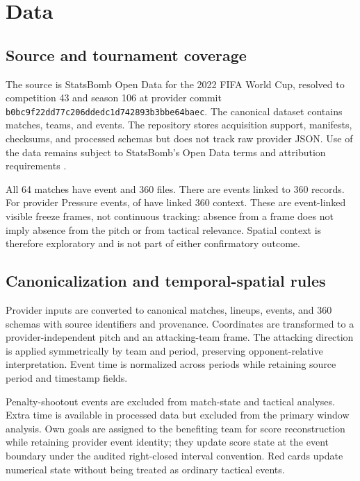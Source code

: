\section{Data}

\subsection{Source and tournament coverage}
The source is StatsBomb Open Data for the 2022 FIFA World Cup, resolved to competition 43 and season 106 at provider commit \texttt{b0bc9f22dd77c206ddedc1d742893b3bbe64baec}. The canonical dataset contains \MatchCount{} matches, \TeamCount{} teams, and \EventCount{} events. The repository stores acquisition support, manifests, checksums, and processed schemas but does not track raw provider JSON. Use of the data remains subject to StatsBomb's Open Data terms and attribution requirements \citep{VERIFY_STATSBOMB_LICENSE_REFERENCE}.

All 64 matches have event and 360 files. There are \FreezeFrameCount{} events linked to 360 records. For provider Pressure events, \PressureFreezeFrameCount{} of \PressureEventCount{} have linked 360 context. These are event-linked visible freeze frames, not continuous tracking: absence from a frame does not imply absence from the pitch or from tactical relevance. Spatial context is therefore exploratory and is not part of either confirmatory outcome.

\subsection{Canonicalization and temporal-spatial rules}
Provider inputs are converted to canonical matches, lineups, events, and 360 schemas with source identifiers and provenance. Coordinates are transformed to a provider-independent pitch and an attacking-team frame. The attacking direction is applied symmetrically by team and period, preserving opponent-relative interpretation. Event time is normalized across periods while retaining source period and timestamp fields.

Penalty-shootout events are excluded from match-state and tactical analyses. Extra time is available in processed data but excluded from the primary window analysis. Own goals are assigned to the benefiting team for score reconstruction while retaining provider event identity; they update score state at the event boundary under the audited right-closed interval convention. Red cards update numerical state without being treated as ordinary tactical events.

